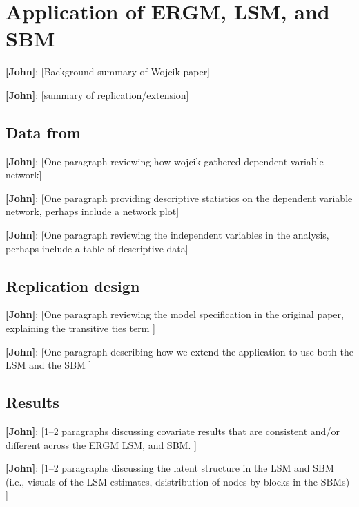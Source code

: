 \documentclass[fleqn,12pt]{wlscirep}
\begin{document}
\section{Application of ERGM, LSM, and SBM}

{\bf [John]}: [Background summary of Wojcik paper] 

{\bf [John]}: [summary of replication/extension]

\subsection{Data from \citet{wojcik2017legislative}}
{\bf [John]}: [One paragraph reviewing how wojcik gathered dependent variable network] 

{\bf [John]}: [One paragraph providing descriptive statistics on the dependent variable network, perhaps include a network plot]

 {\bf [John]}: [One paragraph reviewing the independent variables in the analysis, perhaps include a table of descriptive data]

\subsection{Replication design}

 {\bf [John]}: [One paragraph reviewing the model specification in the original paper, explaining the transitive ties term ]

 {\bf [John]}: [One paragraph describing how we extend the application to use both the LSM and the SBM ]


\subsection{Results}

 {\bf [John]}: [1--2 paragraphs discussing covariate results that are consistent and/or different across the ERGM LSM, and SBM. ]

 {\bf [John]}: [1--2 paragraphs discussing the latent structure in the LSM and SBM (i.e., visuals of the LSM estimates, dsistribution of nodes by blocks in the SBMs) ]
\end{document}
